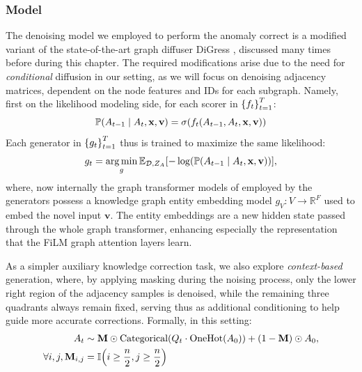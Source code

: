 \subsubsection{Model}
The denoising model we employed to perform the anomaly correct is a modified variant of the state-of-the-art graph diffuser DiGress \cite{vignac_digress_2022}, discussed many times before during this chapter. The required modifications arise due to the need for \emph{conditional} diffusion in our setting, as we will focus on denoising adjacency matrices, dependent on the node features and IDs for each subgraph. 
Namely, first on the likelihood modeling side, for each scorer in $\mathopen{}\left\{f_t\right\}_{t=1}^T$:
\begin{equation}
    \mathbb{P}\mathopen{}\left(A_{t-1} \mid A_t, \mathbf{x}, \mathbf{v}\right)=\sigma\mathopen{}\left(f_t\mathopen{}\left(A_{t-1},A_t,\mathbf{x}, \mathbf{v}\right)\right)
\end{equation}
Each generator in $\mathopen{}\left\{g_t\right\}_{t=1}^T$ thus is trained to maximize the same likelihood:
\begin{equation}
    g_t=\operatorname*{arg\,min}_g{\mathbb{E}_{\mathcal{D},Z_A}\mathopen{}\left[-\log\mathopen{}\left(\mathbb{P}\mathopen{}\left(A_{t-1} \mid A_t, \mathbf{x}, \mathbf{v}\right)\right)\right]},
\end{equation}
where, now internally the graph transformer models of \cite{dwivedi_generalization_2021} employed by the generators possess a knowledge graph entity embedding model $g_V:V\to\mathbb{R}^F$ used to embed the novel input $\mathbf{v}$. The entity embeddings are a new hidden state passed through the whole graph transformer, enhancing especially the representation that the FiLM \cite{perez_film_2018} graph attention layers learn.

As a simpler auxiliary knowledge correction task, we also explore \emph{context-based} generation, where, by applying masking during the noising process, only the lower right region of the adjacency samples is denoised, while the remaining three quadrants always remain fixed, serving thus as additional conditioning to help guide more accurate corrections. Formally, in this setting:
\begin{align}
    \begin{split}
        A_t &\sim \mathbf{M} \odot \text{Categorical}\mathopen{}\left(Q_t \cdot \text{OneHot}\mathopen{}\left(A_0\right)\right) + \mathopen{}\left(1-\mathbf{M}\right) \odot A_0, \\
        \forall i,j, \mathbf{M}_{i,j}&=\mathbb{I}\mathopen{}\left(i \geq \frac{n}{2}, j \geq \frac{n}{2}\right)
    \end{split}
\end{align}

